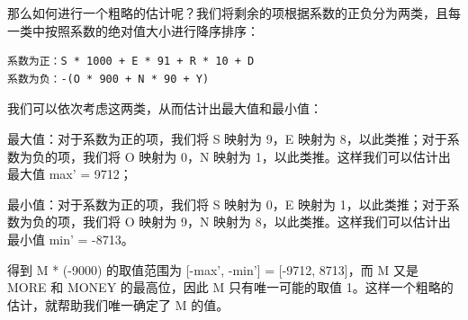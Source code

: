 \documentclass[9pt, b5paaper]{book}
\begin{document}
\begin{enumerate}
那么如何进行一个粗略的估计呢？我们将剩余的项根据系数的正负分为两类，且每一类中按照系数的绝对值大小进行降序排序：
\begin{verbatim}
系数为正：S * 1000 + E * 91 + R * 10 + D
系数为负：-(O * 900 + N * 90 + Y)
\end{verbatim}

我们可以依次考虑这两类，从而估计出最大值和最小值：

最大值：对于系数为正的项，我们将 S 映射为 9，E 映射为 8，以此类推；对于系数为负的项，我们将 O 映射为 0，N 映射为 1，以此类推。这样我们可以估计出最大值 max' = 9712；

最小值：对于系数为正的项，我们将 S 映射为 0，E 映射为 1，以此类推；对于系数为负的项，我们将 O 映射为 9，N 映射为 8，以此类推。这样我们可以估计出最小值 min' = -8713。

得到 M * (-9000) 的取值范围为 [-max', -min'] = [-9712, 8713]，而 M 又是 MORE 和 MONEY 的最高位，因此 M 只有唯一可能的取值 1。这样一个粗略的估计，就帮助我们唯一确定了 M 的值。


\end{enumerate}
\end{document}
